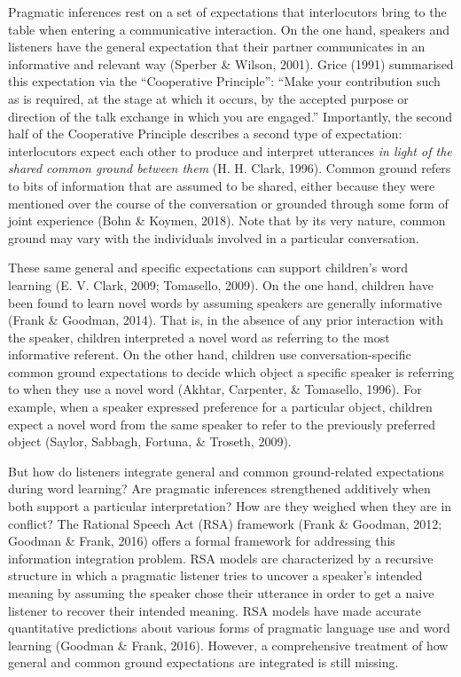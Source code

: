 \documentclass[10pt, letterpaper]{article}
\begin{document}
Pragmatic inferences rest on a set of expectations that interlocutors
bring to the table when entering a communicative interaction. On the one
hand, speakers and listeners have the general expectation that their
partner communicates in an informative and relevant way (Sperber \&
Wilson, 2001). Grice (1991) summarised this expectation via the
``Cooperative Principle'': ``Make your contribution such as is required,
at the stage at which it occurs, by the accepted purpose or direction of
the talk exchange in which you are engaged.'' Importantly, the second
half of the Cooperative Principle describes a second type of
expectation: interlocutors expect each other to produce and interpret
utterances \emph{in light of the shared common ground between them} (H.
H. Clark, 1996). Common ground refers to bits of information that are
assumed to be shared, either because they were mentioned over the course
of the conversation or grounded through some form of joint experience
(Bohn \& Koymen, 2018). Note that by its very nature, common ground may
vary with the individuals involved in a particular conversation.

These same general and specific expectations can support children's word
learning (E. V. Clark, 2009; Tomasello, 2009). On the one hand, children
have been found to learn novel words by assuming speakers are generally
informative (Frank \& Goodman, 2014). That is, in the absence of any
prior interaction with the speaker, children interpreted a novel word as
referring to the most informative referent. On the other hand, children
use conversation-specific common ground expectations to decide which
object a specific speaker is referring to when they use a novel word
(Akhtar, Carpenter, \& Tomasello, 1996). For example, when a speaker
expressed preference for a particular object, children expect a novel
word from the same speaker to refer to the previously preferred object
(Saylor, Sabbagh, Fortuna, \& Troseth, 2009).

But how do listeners integrate general and common ground-related
expectations during word learning? Are pragmatic inferences strengthened
additively when both support a particular interpretation? How are they
weighed when they are in conflict? The Rational Speech Act (RSA)
framework (Frank \& Goodman, 2012; Goodman \& Frank, 2016) offers a
formal framework for addressing this information integration problem.
RSA models are characterized by a recursive structure in which a
pragmatic listener tries to uncover a speaker's intended meaning by
assuming the speaker chose their utterance in order to get a naive
listener to recover their intended meaning. RSA models have made
accurate quantitative predictions about various forms of pragmatic
language use and word learning (Goodman \& Frank, 2016). However, a
comprehensive treatment of how general and common ground expectations
are integrated is still missing.
\end{document}
